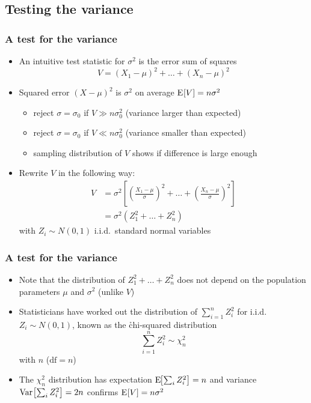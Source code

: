 \documentclass[t]{beamer} %
\begin{document}
\subsection{Testing the variance}

\begin{frame}
  \frametitle{A test for the variance}

  \begin{itemize}
  \item An intuitive test statistic for $\sigma^2$ is the error sum of squares
    \[
    V = (X_1 - \mu)^2 + \dots + (X_n - \mu)^2
    \]
  \item Squared error $(X - \mu)^2$ is $\sigma^2$ on average \so
    $\mathrm{E}_{}[V] = n \sigma^2$
    \begin{itemize}
    \item reject $\sigma = \sigma_0$ if $V\gg n \sigma^2_0$ (variance larger than expected)
    \item reject $\sigma = \sigma_0$ if $V\ll n \sigma^2_0$ (variance smaller than expected)
    \item[\hand] sampling distribution of $V$ shows if difference is large
      enough
    \end{itemize}
    \pause
  \item Rewrite $V$ in the following way:
    \begin{align*}
      V &= \sigma^2 \left[
        \left( \frac{X_1 - \mu}{\sigma} \right)^2 + \dots 
        + \left( \frac{X_n - \mu}{\sigma} \right)^2
      \right] \\
      &= \sigma^2 (Z_1^2 + \dots + Z_n^2)
    \end{align*}
    with $Z_i\sim N(0,1)$ i.i.d.\ standard normal variables
  \end{itemize}
\end{frame}

\begin{frame}
  \frametitle{A test for the variance}
  
  \begin{itemize}
  \item Note that the distribution of $Z_1^2 + \dots + Z_n^2$ does not depend
    on the population parameters $\mu$ and $\sigma^2$ (unlike $V$)
  \item Statisticians have worked out the distribution of $\sum_{i=1}^n Z_i^2$
    for i.i.d.\ $Z_i\sim N(0,1)$, known as the \h{chi-squared distribution}
    \[
    \sum_{i=1}^n Z_i^2 \sim \chi^2_n
    \]
    with $n$  ($\text{df} = n$)
  \item The $\chi^2_n$ distribution has expectation $\mathrm{E}_{}\!\bigl[\sum_i Z_i^2\bigr] =
    n$ and variance $\mathop{\mathrm{Var}}_{}\bigl[\sum_i Z_i^2\bigr] = 2n$ \so confirms $\mathrm{E}_{}[V] = n \sigma^2$%
  \end{itemize}
\end{frame}
\end{document}
